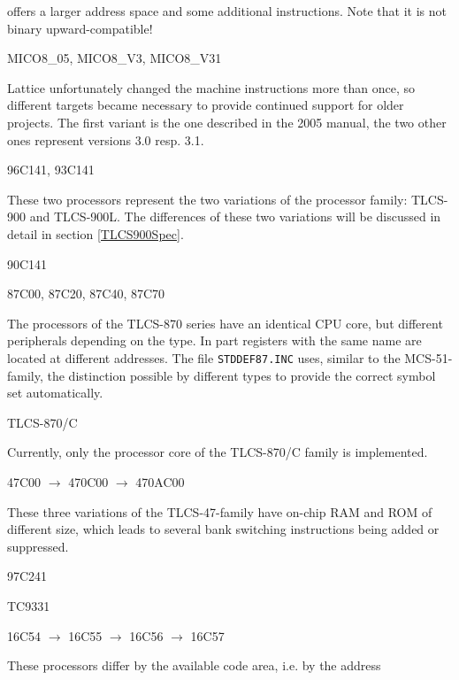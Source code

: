 \documentclass[12pt,twoside]{report}
\newcommand{\tty}[1]{{\tt #1}}
\begin{document}
offers a larger address space and some additional instructions.  Note that
it is not binary upward-compatible!
\begin{cpulist}
   MICO8\_05, MICO8\_V3, MICO8\_V31
\end{cpulist}
Lattice unfortunately changed the machine instructions more than once, so
different targets became necessary to provide continued support for older
projects.  The first variant is the one described in the 2005 manual, the
two other ones represent versions 3.0 resp. 3.1.
\begin{cpulist}
   96C141, 93C141
\end{cpulist}
These two processors represent the two variations of the processor
family: TLCS-900 and TLCS-900L.  The differences of these two variations
will be discussed in detail in section \ref{TLCS900Spec}.
\begin{cpulist}
   90C141
\end{cpulist}
\begin{cpulist}
   87C00, 87C20, 87C40, 87C70
\end{cpulist}
The processors of the TLCS-870 series have an identical CPU core, but
different peripherals depending on the type.  In part registers with
the same name are located at different addresses.  The file
\tty{STDDEF87.INC} uses, similar to the MCS-51-family, the distinction
possible by different types to provide the correct symbol set
automatically.
\begin{cpulist}
   TLCS-870/C
\end{cpulist}
Currently, only the processor core of the TLCS-870/C family is
implemented.
\begin{cpulist}
   47C00 $\rightarrow$ 470C00 $\rightarrow$ 470AC00
\end{cpulist}
These three variations of the TLCS-47-family have on-chip RAM and ROM
of different size, which leads to several bank switching instructions
being added or suppressed.
\begin{cpulist}
   97C241
\end{cpulist}
\begin{cpulist}
   TC9331
\end{cpulist}
\begin{cpulist}
   16C54 $\rightarrow$ 16C55 $\rightarrow$ 16C56 $\rightarrow$ 16C57
\end{cpulist}
These processors differ by the available code area, i.e. by the address
\end{document}
